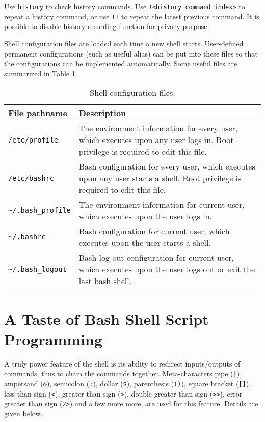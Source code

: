 Use \verb|history| to check history commands. Use \verb|!<history command index>| to repeat a history command, or use \verb|!!| to repeat the latest previous command. It is possible to disable history recording function for privacy purpose.

Shell configuration files are loaded each time a new shell starts. User-defined permanent configurations (such as useful alias) can be put into these files so that the configurations can be implemented automatically. Some useful files are summarized in Table \ref{ch:sb:tab:shellconfig}.

\begin{table}
	\centering \caption{Shell configuration files.}\label{ch:sb:tab:shellconfig}
	\begin{tabularx}{\textwidth}{lX}
		\hline
		File pathname & Description \\ \hline
		\verb|/etc/profile| & The environment information for every user, which executes upon any user logs in. Root privilege is required to edit this file.  \\ \hdashline
		\verb|/etc/bashrc| & Bash configuration for every user, which executes upon any user starts a shell. Root privilege is required to edit this file. \\ \hdashline
		\verb|~/.bash_profile| & The environment information for current user, which executes upon the user logs in. \\ \hdashline
		\verb|~/.bashrc| & Bash configuration for current user, which executes upon the user starts a shell. \\ \hdashline
		\verb|~/.bash_logout| & Bash log out configuration for current user, which executes upon the user logs out or exit the last bash shell. \\ \hline
	\end{tabularx}
\end{table}

\section{A Taste of Bash Shell Script Programming}

A truly power feature of the shell is its ability to redirect inputs/outputs of commands, thus to chain the commands together. Meta-characters pipe (\verb?|?), ampersand (\verb|&|), semicolon (\verb|;|), dollar (\verb|$|), parenthesis (\verb|()|), square bracket (\verb|[]|), less than sign (\verb|<|), greater than sign (\verb|>|), double greater than sign (\verb|>>|), error greater than sign (\verb|2>|) and a few more more, are used for this feature. Details are given below.

